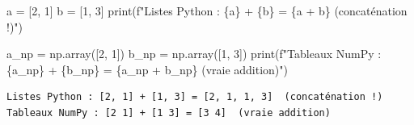 \documentclass[
  french,
  11pt,
  a4paper,
]{scrbook}
\newenvironment{Shaded}{}{}
\newcommand{\BuiltInTok}[1]{\textcolor[rgb]{0.84,0.23,0.29}{#1}}
\newcommand{\DecValTok}[1]{\textcolor[rgb]{0.00,0.36,0.77}{#1}}
\newcommand{\NormalTok}[1]{\textcolor[rgb]{0.14,0.16,0.18}{#1}}
\newcommand{\OperatorTok}[1]{\textcolor[rgb]{0.14,0.16,0.18}{#1}}
\newcommand{\SpecialCharTok}[1]{\textcolor[rgb]{0.00,0.36,0.77}{#1}}
\newcommand{\SpecialStringTok}[1]{\textcolor[rgb]{0.01,0.18,0.38}{#1}}
\begin{document}
\begin{Shaded}
\begin{Highlighting}[]
\NormalTok{a }\OperatorTok{=}\NormalTok{ [}\DecValTok{2}\NormalTok{, }\DecValTok{1}\NormalTok{]}
\NormalTok{b }\OperatorTok{=}\NormalTok{ [}\DecValTok{1}\NormalTok{, }\DecValTok{3}\NormalTok{]}
\BuiltInTok{print}\NormalTok{(}\SpecialStringTok{f"Listes Python : }\SpecialCharTok{\{}\NormalTok{a}\SpecialCharTok{\}}\SpecialStringTok{ + }\SpecialCharTok{\{}\NormalTok{b}\SpecialCharTok{\}}\SpecialStringTok{ = }\SpecialCharTok{\{}\NormalTok{a }\OperatorTok{+}\NormalTok{ b}\SpecialCharTok{\}}\SpecialStringTok{  (concaténation !)"}\NormalTok{)}

\NormalTok{a\_np }\OperatorTok{=}\NormalTok{ np.array([}\DecValTok{2}\NormalTok{, }\DecValTok{1}\NormalTok{])}
\NormalTok{b\_np }\OperatorTok{=}\NormalTok{ np.array([}\DecValTok{1}\NormalTok{, }\DecValTok{3}\NormalTok{])}
\BuiltInTok{print}\NormalTok{(}\SpecialStringTok{f"Tableaux NumPy : }\SpecialCharTok{\{}\NormalTok{a\_np}\SpecialCharTok{\}}\SpecialStringTok{ + }\SpecialCharTok{\{}\NormalTok{b\_np}\SpecialCharTok{\}}\SpecialStringTok{ = }\SpecialCharTok{\{}\NormalTok{a\_np }\OperatorTok{+}\NormalTok{ b\_np}\SpecialCharTok{\}}\SpecialStringTok{  (vraie addition)"}\NormalTok{)}
\end{Highlighting}
\end{Shaded}

\begin{verbatim}
Listes Python : [2, 1] + [1, 3] = [2, 1, 1, 3]  (concaténation !)
Tableaux NumPy : [2 1] + [1 3] = [3 4]  (vraie addition)
\end{verbatim}
\end{document}

